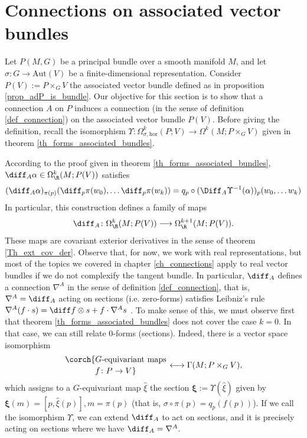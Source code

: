 \section{Connections on associated vector bundles}\label{section_connections_associated_bundles}
Let \(P(M,G)\) be a principal bundle over a smooth manifold \(M\), and let \(\sigma\colon G \to \mathrm{Aut}(V)\) be a finite-dimensional representation. Consider \(P(V):=P \times_G V\) the associated vector bundle defined as in proposition \ref{prop_adP_is_bundle}. Our objective for this section is to show that a connection \(A\) on \(P\) induces a connection (in the sense of definition \ref{def_connection}) on the associated vector bundle \(P(V)\). Before giving the definition, recall the isomorphism \(\Upsilon\colon \Omega^k_{\sigma, \mathrm{hor}}(P;V) \to \Omega^k(M;P\times_GV)\) given in theorem \ref{th_forms_associated_bundles}.

According to the proof given in theorem \ref{th_forms_associated_bundles}, \(\diff_A \alpha \in \Omega^k_\R(M;P(V))\) satisfies
\begin{equation} \label{eq_def_cov_der_induced}
(\diff_A \alpha)_{\pi(p)}(\diff_p\pi(w_0), \ldots \diff_p\pi(w_{k}))=q_p\circ (\Diff_A\Upsilon^{-1}(\alpha))_p(w_0, \ldots w_{k})
\end{equation}
In particular, this construction defines a family of maps 
\[
\diff_A\colon \Omega^k_\R(M;P(V))\longrightarrow \Omega^{k+1}_\R(M;P(V)).
\]
These maps are covariant exterior derivatives in the sense of theorem \ref{Th_ext_cov_der}. Observe that, for now, we work with real representations, but most of the topics we covered in chapter \ref{ch_connections} apply to real vector bundles if we do not complexify the tangent bundle. In particular, \(\diff_A\) defines a connection \(\nabla^A\) in the sense of definition \ref{def_connection}, that is, \(\nabla^A=\diff_A\) acting on sections (i.e. zero-forms) satisfies Leibniz's rule \(\nabla^A(f\cdot s)=\diff f \otimes s+f\cdot \nabla^A s\) \parencite[Prop. 1.5.4]{Rudolph_2017pug}. To make sense of this, we must observe first that theorem \ref{th_forms_associated_bundles} does not cover the case \(k=0\). In that case, we can still relate \(0\)-forms (sections). Indeed, there is a vector space isomorphism \parencite[Prop. 1.2.6]{Rudolph_2017pug}
\begin{equation} \label{eq_bijec_G_eqiva_sections}
\corch{G\text{-equivariant maps} \atop f\colon P \to V} \longleftrightarrow \Gamma(M; P \times_G V),
\end{equation}
which assigns to a \(G\)-equivariant map \(\hat{\xi}\) the section \(\bm{\xi}:=\Upsilon(\hat{\xi})\) given by \(\bm{\xi}(m)=[p,\hat{\xi}(p)], m=\pi(p)\) (that is, \(\sigma \circ \pi(p) = q_p(f(p))\)). If we call the isomorphism \(\Upsilon\), we can extend \(\diff_A\) to act on sections, and it is precisely acting on sections where we have \(\diff_A=\nabla^A\).

